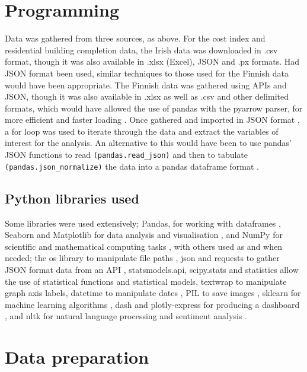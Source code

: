 \documentclass[hidelinks,12pt,oneside]{report} %
\begin{document}
\section{Programming}
Data was gathered from three sources, as above. For the cost index and residential building completion data, the Irish data was downloaded in .csv format, though it was also available in .xlsx (Excel), JSON and .px formats. Had JSON format been used, similar techniques to those used for the Finnish data would have been appropriate. The Finnish data was gathered using APIs and JSON, though it was also available in .xlsx as well as .csv and other delimited formats, which would have allowed the use of pandas with the pyarrow parser, for more efficient and faster loading \citep{pyarrow}. Once gathered and imported in JSON format \citep{PxWeb}, a for loop was used to iterate through the data and extract the variables of interest for the analysis. An alternative to this would have been to use pandas' JSON functions to read  
\verb|(pandas.read_json)| \citep{read} and then to tabulate \verb|(pandas.json_normalize)| the data into a pandas dataframe format \citep{norm}.

\subsection{Python libraries used}
Some libraries were used extensively; Pandas, for working with dataframes \citep{pandas}, Seaborn and Matplotlib for data analysis and visualisation \citep{seaborn, matplotlib}, and NumPy for scientific and mathematical computing tasks \citep{numpy}, with others used as and when needed; the os library to manipulate file paths \citep{os}, json and requests to gather JSON format data from an API \citep{requests, json},  statsmodels.api, scipy.stats and statistics \citep{statsmodels, scipystats, statistics} allow the use of statistical functions and statistical models, textwrap \citep{textwrap} to manipulate graph axis labels, datetime to manipulate dates \citep{datetime}, PIL to save images \citep{pillow}, sklearn for machine learning algorithms \citep{sklearn}, dash and plotly-express for producing a dashboard \citep{dash, plotly}, and nltk for natural language processing and sentiment analysis \citep{nltk}.

\section{Data preparation}
\end{document}
